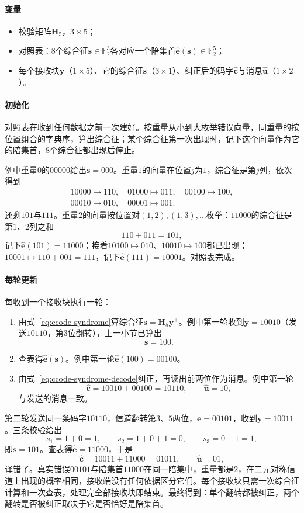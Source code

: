 \paragraph{变量}
\begin{itemize}
 \item 校验矩阵$\bm{H}_5$，$3\times5$；
 \item 对照表：$8$个综合征$\bm{s}\in\mathbb{F}_2^{3}$各对应一个陪集首$\hat{\bm{e}}(\bm{s})\in\mathbb{F}_2^{5}$；
 \item 每个接收块$\bm{y}$（$1\times5$）、它的综合征$\bm{s}$（$3\times1$）、纠正后的码字$\hat{\bm{c}}$与消息$\hat{\bm{u}}$（$1\times2$）。
\end{itemize}

\paragraph{初始化}
对照表在收到任何数据之前一次建好。按重量从小到大枚举错误向量，同重量的按位置组合的字典序，算出综合征；某个综合征第一次出现时，记下这个向量作为它的陪集首，$8$个综合征都出现后停止。

例中重量$0$的$00000$给出$\bm{s}=000$。重量$1$的向量在位置$j$为$1$，综合征是第$j$列，依次得到
\[
 \begin{gathered}
 10000\mapsto110,\quad 01000\mapsto011,\quad 00100\mapsto100,\\
 00010\mapsto010,\quad 00001\mapsto001 .
 \end{gathered}
\]
还剩$101$与$111$。重量$2$的向量按位置对$(1,2),(1,3),\dots$枚举：$11000$的综合征是第$1$、$2$列之和
\[
 110+011=101 ,
\]
记下$\hat{\bm{e}}(101)=11000$；接着$10100\mapsto010$、$10010\mapsto100$都已出现；$10001\mapsto110+001=111$，记下$\hat{\bm{e}}(111)=10001$。对照表完成。

\paragraph{每轮更新}
每收到一个接收块执行一轮：
\begin{enumerate}
 \item 由式~\eqref{eq:ccode-syndrome}算综合征$\bm{s}=\bm{H}_5\bm{y}^{\top}$。例中第一轮收到$\bm{y}=10010$（发送$10110$，第$3$位翻转），上一小节已算出
 \[
  \bm{s}=100 .
 \]
 \item 查表得$\hat{\bm{e}}(\bm{s})$。例中第一轮$\hat{\bm{e}}(100)=00100$。
 \item 由式~\eqref{eq:ccode-syndrome-decode}纠正，再读出前两位作为消息。例中第一轮
 \[
  \hat{\bm{c}}=10010+00100=10110,\qquad \hat{\bm{u}}=10 ,
 \]
 与发送的消息一致。
\end{enumerate}
第二轮发送同一条码字$10110$，信道翻转第$3$、$5$两位，$\bm{e}=00101$，收到$\bm{y}=10011$。三条校验给出
\[
 s_1=1+0=1,\qquad s_2=1+0+1=0,\qquad s_3=0+1=1 ,
\]
即$\bm{s}=101$。查表得$\hat{\bm{e}}=11000$，于是
\[
 \hat{\bm{c}}=10011+11000=01011,\qquad \hat{\bm{u}}=01 ,
\]
译错了。真实错误$00101$与陪集首$11000$在同一陪集中，重量都是$2$，在二元对称信道上出现的概率相同，接收端没有任何依据区分它们。每个接收块只需一次综合征计算和一次查表，处理完全部接收块即结束。最终得到：单个翻转都被纠正，两个翻转是否被纠正取决于它是否恰好是陪集首。

